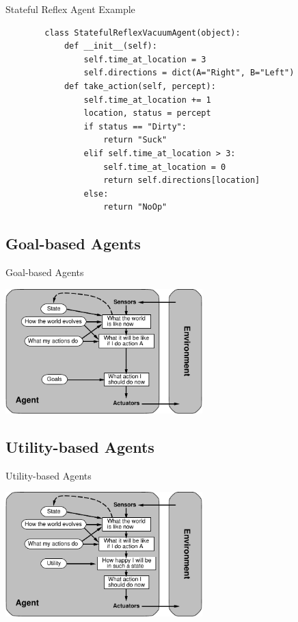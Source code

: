 \documentclass[12pt]{beamer}
\begin{document}
\begin{frame}[fragile]{Stateful Reflex Agent Example}
	\footnotesize
	\begin{lstlisting}
		class StatefulReflexVacuumAgent(object):
		    def __init__(self):
		        self.time_at_location = 3
		        self.directions = dict(A="Right", B="Left")
		    def take_action(self, percept):
		        self.time_at_location += 1
		        location, status = percept
		        if status == "Dirty":
		            return "Suck"
		        elif self.time_at_location > 3:
		            self.time_at_location = 0
		            return self.directions[location]
		        else:
		            return "NoOp"
	\end{lstlisting}
\end{frame}


\subsection{Goal-based Agents}
\begin{frame}{Goal-based Agents}
	\begin{center}
		\includegraphics[width=3in]{goal-based-agent.pdf}
	\end{center}
\end{frame}

\subsection{Utility-based Agents}
\begin{frame}{Utility-based Agents}
	\begin{center}
		\includegraphics[width=3in]{utility-based-agent.pdf}
	\end{center}
\end{frame}
\end{document}
